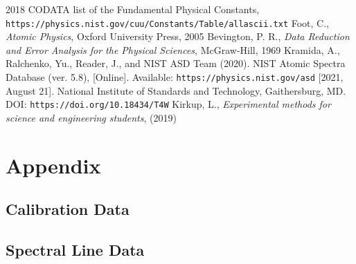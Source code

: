 \documentclass[11pt]{article}
\numberwithin{equation}{section}
\numberwithin{figure}{section}
\numberwithin{table}{section}
\begin{document}
\begin{thebibliography}{9}
    2018 CODATA list of the Fundamental Physical Constants, \texttt{https://physics.nist.gov/cuu/Constants/Table/allascii.txt}
    Foot, C., \textit{Atomic Physics}, Oxford University Press, 2005
    Bevington, P. R., \textit{Data Reduction and Error Analysis for the Physical Sciences}, McGraw-Hill, 1969
    Kramida, A., Ralchenko, Yu., Reader, J., and NIST ASD Team (2020). NIST Atomic Spectra Database (ver. 5.8), [Online]. Available: \texttt{https://physics.nist.gov/asd} [2021, August 21]. National Institute of Standards and Technology, Gaithersburg, MD. DOI: \texttt{https://doi.org/10.18434/T4W}
    Kirkup, L., \textit{Experimental methods for science and engineering students}, (2019)
\end{thebibliography}


\newpage
\section{Appendix}\label{sec:Appendix}
\setcounter{figure}{0} \renewcommand{\thefigure}{A.\arabic{figure}}
\subsection{Calibration Data}\label{sec:Calibration Data}


\subsection{Spectral Line Data}\label{sec:Spectral Line Data}
\end{document}
